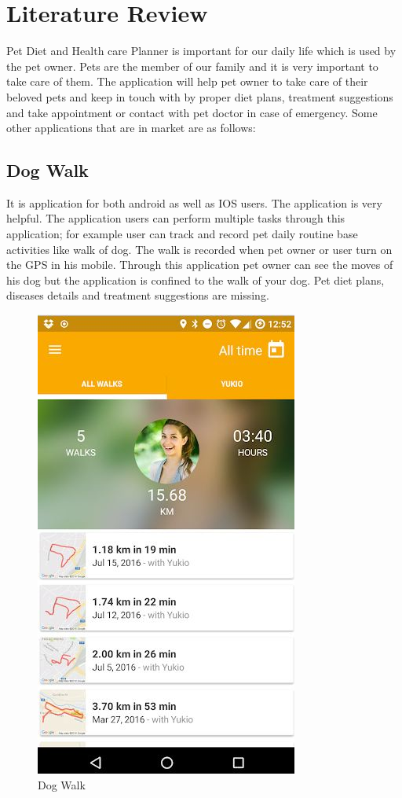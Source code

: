 \chapter{Literature Review} \label{chap:literatureReview}


Pet Diet and Health care Planner is important for our daily life which is used by the pet owner. Pets are the member of our family and it is very important to take care of them. The application will help pet owner to take care of their beloved pets and keep in touch with by proper diet plans, treatment suggestions and take appointment or contact with pet doctor in case of emergency. Some other applications that are in market are as follows:
\section{Dog Walk \cite{capsix}}
It is application for both android as well as IOS users. The application is very helpful. The application users can perform multiple tasks through this application; for example user can track and record   pet daily routine base activities like walk of dog. The walk is recorded when pet owner or user turn on the GPS in his mobile. Through this application pet owner can see the moves of his dog but the application is confined to the walk of your dog. Pet diet plans, diseases details and treatment suggestions are missing.
\begin{figure}[H] 
  \centering
    \includegraphics[scale=0.3]{21dogwalk}
     \caption{Dog Walk}
\end{figure}
